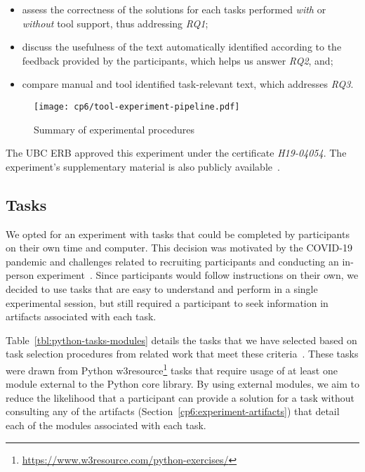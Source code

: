 \begin{itemize}
    \item assess the correctness of the solutions for each tasks performed \textit{with} or \textit{without} tool support, thus addressing \textit{RQ1};
     
    \item discuss the usefulness of the text automatically identified  according to the feedback provided by the participants, which helps us answer \textit{RQ2}, and;

    \item compare manual and tool identified task-relevant text, which addresses \textit{RQ3}. 
\end{itemize}
 


\begin{figure}[h!]
\centering
\texttt{[image: cp6/tool-experiment-pipeline.pdf]}
\caption{Summary of experimental procedures}
\label{fig:tool-experiment-procedures}
\end{figure}



The \acs{UBC} \acs{ERB} approved this experiment under the certificate \textit{H19-04054}.
The experiment's supplementary material is also publicly available~\cite{cp6_supplementary_material}.



\subsection{Tasks}
\label{cp6:tasks}


We opted for an experiment with tasks that could be completed by participants on their own time and computer.
This decision was motivated by the COVID-19 pandemic and challenges related to recruiting participants and conducting an in-person experiment~\cite{russo2021a, russo2021b}. 
Since participants would follow instructions on their own, we decided to use tasks that are easy to understand and perform in a single experimental session, but still required a participant  
to seek information in artifacts associated with each task.


Table~\ref{tbl:python-tasks-modules} details the tasks that we have selected based on task selection procedures from related work that meet these criteria~\cite{thiselton2019}. 
These tasks were drawn from
Python w3resource\footnote{\url{https://www.w3resource.com/python-exercises/}} tasks
that require usage of at least one module external to the Python core library.
By using external modules, we aim to reduce the likelihood that a participant 
can provide a solution for a task without consulting any of the artifacts (Section~\ref{cp6:experiment-artifacts})
that detail each of the modules associated with each task. 


